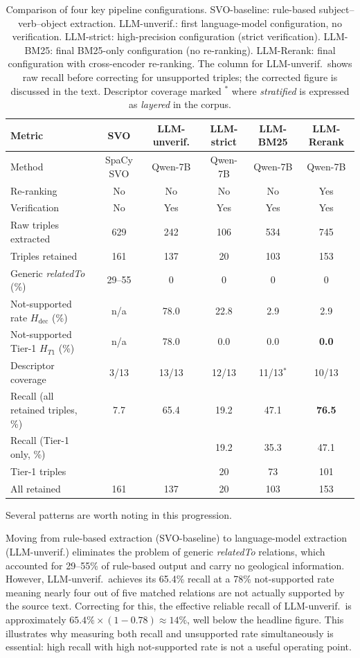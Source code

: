 \documentclass[10pt]{article}
\begin{document}
\begin{table}[htb]
\centering
\caption{Comparison of four key pipeline configurations.
  SVO-baseline: rule-based subject--verb--object extraction.
  LLM-unverif.: first language-model configuration, no verification.
  LLM-strict: high-precision configuration (strict verification).
  LLM-BM25: final BM25-only configuration (no re-ranking).
  LLM-Rerank: final configuration with cross-encoder re-ranking.
  The column for LLM-unverif.\ shows raw recall before correcting for
  unsupported triples; the corrected figure is discussed in
  the text.
  Descriptor coverage marked $^*$ where \emph{stratified}
  is expressed as \emph{layered} in the corpus.}
\label{tab:runs}
\setlength{\tabcolsep}{5pt}
\small
\begin{tabular}{lccccc}
\toprule
\textbf{Metric}
  & \textbf{SVO}
  & \textbf{LLM-unverif.}
  & \textbf{LLM-strict}
  & \textbf{LLM-BM25}
  & \textbf{LLM-Rerank} \\
\midrule
Method
  & SpaCy SVO & Qwen-7B & Qwen-7B & Qwen-7B & Qwen-7B \\
Re-ranking
  & No & No & No & No & Yes \\
Verification
  & No & Yes & Yes & Yes & Yes \\
\midrule
Raw triples extracted  & 629 & 242 & 106 & 534 & 745 \\
Triples retained   & 161 & 137 &  20 & 103 & 153 \\
\midrule
Generic \emph{relatedTo} (\%)
  & 29--55 & 0 & 0 & 0 & 0 \\
\midrule
Not-supported rate $H_{\text{dec}}$ (\%)
  & n/a & 78.0 & 22.8 & 2.9 & 2.9 \\
Not-supported Tier-1 $H_{T1}$ (\%)
  & n/a & 78.0 & 0.0  & 0.0 & \textbf{0.0} \\
\midrule
Descriptor coverage
  & 3/13 & 13/13 & 12/13 & 11/13$^*$ & 10/13 \\
Recall (all retained triples, \%)
  & 7.7 & 65.4 & 19.2 & 47.1 & \textbf{76.5} \\
Recall (Tier-1 only, \%)
  &  &  & 19.2 & 35.3 & 47.1 \\
\midrule
Tier-1 triples  &  &  &  20 &  73 & 101 \\
All retained  & 161 & 137 &  20 & 103 & 153 \\
\bottomrule
\end{tabular}
\end{table}

Several patterns are worth noting in this progression.

Moving from rule-based extraction (SVO-baseline) to language-model extraction
(LLM-unverif.) eliminates the problem of generic \emph{relatedTo} relations,
which accounted for 29--55\% of rule-based output and carry no
geological information.
However, LLM-unverif.\ achieves its 65.4\% recall at a 78\% not-supported
rate  meaning nearly four out of five matched relations are
not actually supported by the source text.
Correcting for this, the effective reliable recall of LLM-unverif.\ is
approximately $65.4\% \times (1 - 0.78) \approx 14\%$,
well below the headline figure.
This illustrates why measuring both recall and unsupported rate
simultaneously is essential: high recall with high not-supported
rate is not a useful operating point.
\end{document}
